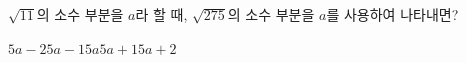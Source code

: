 $\sqrt{11}$의 소수 부분을 $a$라 할 때, $\sqrt{275}$의 소수 부분을 $a$를 사용하여 나타내면?
\begin{choices32}{$5a-2$}{$5a-1$}{$5a$}{$5a+1$}{$5a+2$}\end{choices32}
